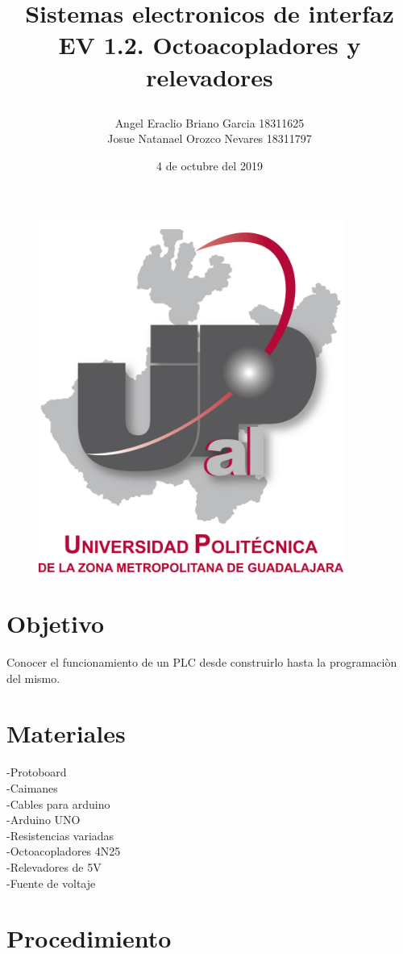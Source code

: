 \documentclass[12pt,a4paper]{article}
\title{\textbf{Sistemas electronicos de interfaz\\EV 1.2. Octoacopladores y relevadores}
\author{Angel Eraclio Briano Garcia 18311625\\Josue Natanael Orozco Nevares 18311797}
\date{4 de octubre del 2019}}
\begin{document}
\maketitle

\begin{figure}[h!]
\centering
\includegraphics[width=10cm]{UPCDLZMDG5783-logo.png} 
\end{figure}
\newpage

\section{Objetivo}
Conocer el funcionamiento de un PLC desde construirlo hasta la programaciòn del mismo.

\section{Materiales}
-Protoboard\\-Caimanes\\-Cables para arduino\\-Arduino UNO\\-Resistencias variadas\\-Octoacopladores 4N25\\-Relevadores de 5V\\-Fuente de voltaje

\section{Procedimiento}
\end{document}
